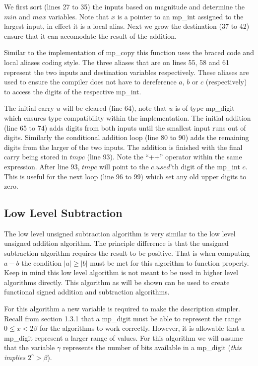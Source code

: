 \documentclass[b5paper]{book}
\begin{document}
We first sort (lines 27 to 35) the inputs based on magnitude and determine the $min$ and $max$ variables.
Note that $x$ is a pointer to an mp\_int assigned to the largest input, in effect it is a local alias.  Next we
grow the destination (37 to 42) ensure that it can accomodate the result of the addition. 

Similar to the implementation of mp\_copy this function uses the braced code and local aliases coding style.  The three aliases that are on 
lines 55, 58 and 61 represent the two inputs and destination variables respectively.  These aliases are used to ensure the
compiler does not have to dereference $a$, $b$ or $c$ (respectively) to access the digits of the respective mp\_int.

The initial carry $u$ will be cleared (line 64), note that $u$ is of type mp\_digit which ensures type 
compatibility within the implementation.  The initial addition (line 65 to 74) adds digits from
both inputs until the smallest input runs out of digits.  Similarly the conditional addition loop
(line 80 to 90) adds the remaining digits from the larger of the two inputs.  The addition is finished 
with the final carry being stored in $tmpc$ (line 93).  Note the ``++'' operator within the same expression.
After line 93, $tmpc$ will point to the $c.used$'th digit of the mp\_int $c$.  This is useful
for the next loop (line 96 to 99) which set any old upper digits to zero.

\subsection{Low Level Subtraction}
The low level unsigned subtraction algorithm is very similar to the low level unsigned addition algorithm.  The principle difference is that the
unsigned subtraction algorithm requires the result to be positive.  That is when computing $a - b$ the condition $\vert a \vert \ge \vert b\vert$ must 
be met for this algorithm to function properly.  Keep in mind this low level algorithm is not meant to be used in higher level algorithms directly.  
This algorithm as will be shown can be used to create functional signed addition and subtraction algorithms.


For this algorithm a new variable is required to make the description simpler.  Recall from section 1.3.1 that a mp\_digit must be able to represent
the range $0 \le x < 2\beta$ for the algorithms to work correctly.  However, it is allowable that a mp\_digit represent a larger range of values.  For 
this algorithm we will assume that the variable $\gamma$ represents the number of bits available in a 
mp\_digit (\textit{this implies $2^{\gamma} > \beta$}).  
\end{document}
